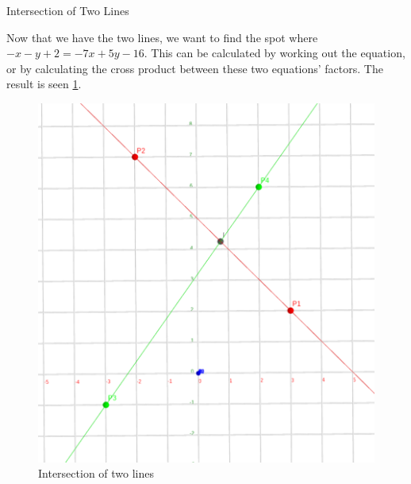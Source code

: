 \documentclass[twocolumn]{article}
\begin{document}
    \begin{section}{Intersection of Two Lines}

      Now that we have the two lines, we want to find the spot where $-x -y + 2
= -7x +5y - 16$. This can be calculated by working out the equation, or by
calculating the cross product between these two equations' factors. The result
is seen \cref{fig:line-intersection}.

      \begin{figure}
        \centering
        \includegraphics[width=0.85\linewidth]{./res/3.png}
        \caption{Intersection of two lines}
        \label{fig:line-intersection}
      \end{figure}

    \end{section}
\end{document}

